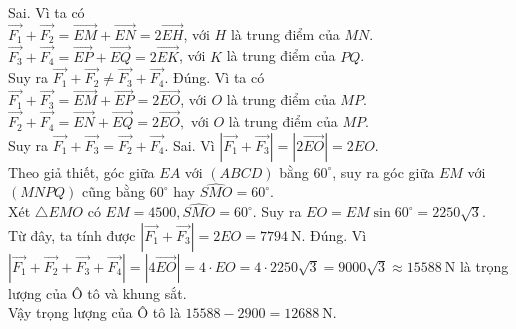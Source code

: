 \begin{ex}
{		\begin{itemchoice}
			\itemch Sai. Vì ta có\\
			$\overrightarrow{F_1}+\overrightarrow{F_2}=\overrightarrow{E M}+\overrightarrow{EN}=2 \overrightarrow{EH}$, với $H$ là trung điểm của $MN$.\\
			$\overrightarrow{F_3}+\overrightarrow{F_4}=\overrightarrow{EP}+\overrightarrow{EQ}=2\overrightarrow{EK}$, với $K$ là trung điểm của $PQ$.\\
			Suy ra $\overrightarrow{F_1}+\overrightarrow{F_2} \neq \overrightarrow{F_3}+\overrightarrow{F_4}$.
			\itemch Đúng. Vì ta có\\
			$\overrightarrow{F_1}+\overrightarrow{F_3}=\overrightarrow{E M}+\overrightarrow{E P}=2 \overrightarrow{E O}$, với $O$ là trung điểm của $MP$.\\
			$\overrightarrow{F_2}+\overrightarrow{{{F}_{4}}}=\overrightarrow{EN}+\overrightarrow{EQ}=2\overrightarrow{EO},$ với $O$ là trung điểm của $MP$.\\
			Suy ra $\overrightarrow{F_1}+\overrightarrow{F_3}=\overrightarrow{F_2}+\overrightarrow{F_4}$.
			\itemch Sai. Vì $\left|\overrightarrow{F_1}+\overrightarrow{F_3}\right|=\left|2 \overrightarrow{EO}\right|=2EO$.\\
			Theo giả thiết, góc giữa $EA$ với $(ABCD)$ bằng $60^{\circ}$, suy ra góc giữa $EM$ với $(M N P Q)$ cũng bằng $60^{\circ}$ hay $\widehat{SMO}=60^{\circ}$.\\
			Xét $\triangle EMO$ có $EM=4500,\widehat{SMO}=60^{\circ}$. Suy ra $EO=EM\sin 60^{\circ}=2250\sqrt{3}$.\\
			Từ đây, ta tính được $\left| \overrightarrow{F_1}+\overrightarrow{F_3} \right|=2EO=7794~\text{N}$.
			\itemch Đúng. Vì $\left| \overrightarrow{F_1}+\overrightarrow{F_2}+\overrightarrow{F_3}+\overrightarrow{F_4} \right|=\left|4\overrightarrow{EO}\right|=4 \cdot EO=4 \cdot 2250\sqrt{3}=9000\sqrt{3}\approx 15588~\text{N}$ là trọng lượng của Ô tô và khung sắt.\\
			Vậy trọng lượng của Ô tô là $15588-2900=12688~\text{N}$.
		\end{itemchoice}
	}
\end{ex}

